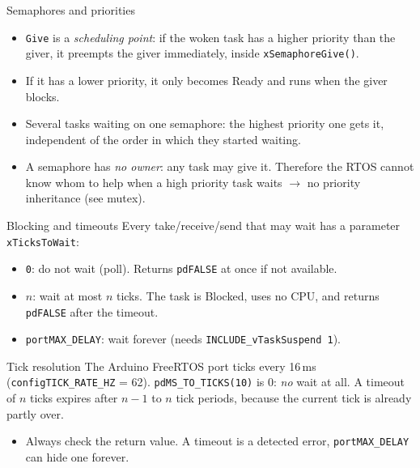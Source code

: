 \begin{frame}{Semaphores and priorities}
  \begin{itemize}
    \item \texttt{Give} is a \emph{scheduling point}: if the woken task has a higher priority than the giver, it preempts the giver immediately, inside \texttt{xSemaphoreGive()}.
    \item If it has a lower priority, it only becomes Ready and runs when the giver blocks.
    \item Several tasks waiting on one semaphore: the highest priority one gets it, independent of the order in which they started waiting.
    \item A semaphore has \emph{no owner}: any task may give it. Therefore the RTOS cannot know whom to help when a high priority task waits $\rightarrow$ no priority inheritance (see mutex).
  \end{itemize}
\end{frame}

\begin{frame}{Blocking and timeouts}
  Every take/receive/send that may wait has a parameter \texttt{xTicksToWait}:
  \begin{itemize}
    \item \texttt{0}: do not wait (poll). Returns \texttt{pdFALSE} at once if not available.
    \item $n$: wait at most $n$ ticks. The task is Blocked, uses no CPU, and returns \texttt{pdFALSE} after the timeout.
    \item \texttt{portMAX\_DELAY}: wait forever (needs \texttt{INCLUDE\_vTaskSuspend 1}).
  \end{itemize}
  \begin{alertblock}{Tick resolution}
    The Arduino FreeRTOS port ticks every 16\,ms (\texttt{configTICK\_RATE\_HZ} = 62). \texttt{pdMS\_TO\_TICKS(10)} is 0: \emph{no} wait at all. A timeout of $n$ ticks expires after $n-1$ to $n$ tick periods, because the current tick is already partly over.
  \end{alertblock}
  \begin{itemize}
    \item Always check the return value. A timeout is a detected error, \texttt{portMAX\_DELAY} can hide one forever.
  \end{itemize}
\end{frame}

